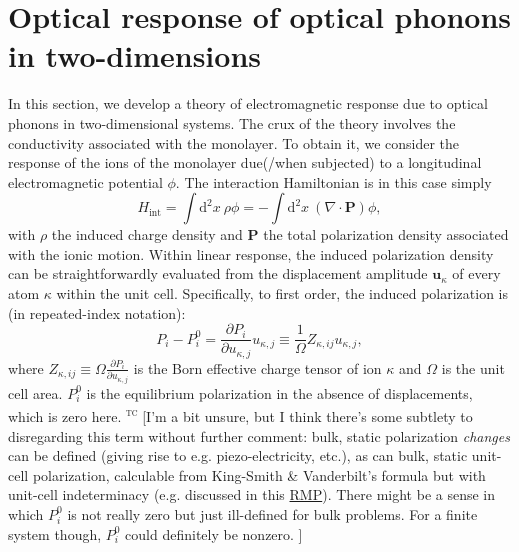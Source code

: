 \documentclass[aps,prb,twocolumn,
	           groupedaddress,superscriptaddress,
               amsfonts,amssymb,amsmath,floatfix,
	           citeautoscript]{revtex4-1}
\makeatletter
\newcommand{\dd}{\mathrm{d}}
\newcommand{\eg}{e.g.\@\xspace}
\newcommand{\comment}[2]{%
    \ifbool{togglecomments}%
    {\textcolor{blue!70!black}{\small\textsf{%
    \textsuperscript{\textsc{\textsf{\MakeLowercase{#1}}}}%
    [#2]}}} %
    {}}     %
\makeatother
\begin{document}
\section{Optical response of optical phonons in two-dimensions}


In this section, we develop a theory of electromagnetic response due to optical phonons in two-dimensional systems. The crux of the theory involves the conductivity associated with the monolayer. To obtain it, we consider the response of the ions of the monolayer due(/when subjected) to a longitudinal electromagnetic potential $\phi$. The interaction Hamiltonian is in this case simply
\begin{equation}
    H_{\mathrm{int}} = \int \dd^2x ~\rho \phi = -\int \dd^2x~ (\nabla\cdot\mathbf{P})\phi,
    \label{eq:coupling}
\end{equation} 
with $\rho$ the induced charge density and $\mathbf{P}$ the total polarization density associated with the ionic motion. 
Within linear response, the induced polarization density can be straightforwardly evaluated from the displacement amplitude $\mathbf{u}_{\kappa}$ of every atom $\kappa$ within the unit cell. Specifically, to first order, the induced polarization is (in repeated-index notation):
\begin{equation}
    P_i - P_i^{0} = \frac{\partial P_i}{\partial u_{\kappa,j}}u_{\kappa,j} \equiv \frac{1}{\Omega}Z_{\kappa,ij}u_{\kappa,j},
\end{equation} 
where $Z_{\kappa,ij} \equiv \Omega\frac{\partial P_i}{\partial u_{\kappa,j}} $ is the Born effective charge tensor of ion $\kappa$ and $\Omega$ is the unit cell area. $P_i^{0}$ is the equilibrium polarization in the absence of displacements, which is zero here. 
	\comment{tc}{I'm a bit unsure, but I think there's some subtlety to disregarding this term without further comment: bulk, static polarization \emph{changes} can be defined (giving rise to e.g. piezo-electricity, etc.), as can bulk, static unit-cell polarization, calculable from King-Smith \& Vanderbilt's formula but with unit-cell indeterminacy (\eg discussed in this \href{https://doi.org/10.1103/RevModPhys.82.1959}{RMP}). 
	There might be a sense in which $P_i^0$ is not really zero but just ill-defined for bulk problems.
	For a finite system though, $P_i^0$ could definitely be nonzero. }
\end{document}

